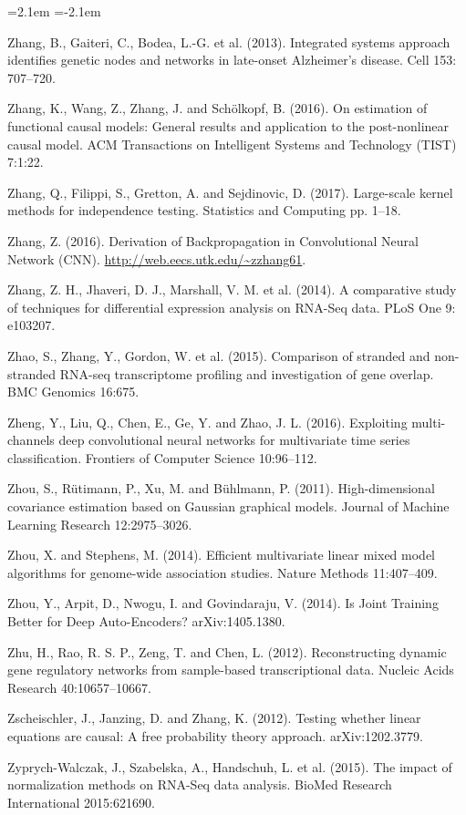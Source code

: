 \begin{list}{}{\leftmargin=2.1em  
  \itemindent=-2.1em \parsep=0pt \itemsep=2pt \topsep=0pt}
\item Zhang, B., Gaiteri, C., Bodea, L.-G. et al. (2013). Integrated systems approach identifies genetic nodes and networks in late-onset Alzheimer's disease. Cell 153: 707--720.
\item Zhang, K., Wang, Z., Zhang, J. and Schölkopf, B. (2016). On estimation of functional causal models: General results and application to the post-nonlinear causal model. ACM Transactions on Intelligent Systems and Technology (TIST) 7:1:22.
\item Zhang, Q., Filippi, S., Gretton, A. and Sejdinovic, D. (2017). Large-scale kernel methods for independence testing. Statistics and Computing pp. 1--18.
\item Zhang, Z. (2016). Derivation of Backpropagation in Convolutional Neural Network (CNN). \url{http://web.eecs.utk.edu/~zzhang61}.
\item Zhang, Z. H., Jhaveri, D. J., Marshall, V. M. et al. (2014). A comparative study of techniques for differential expression analysis on RNA-Seq data. PLoS One 9: e103207.
\item Zhao, S., Zhang, Y., Gordon, W. et al. (2015). Comparison of stranded and non-stranded RNA-seq transcriptome profiling and investigation of gene overlap. BMC Genomics 16:675.
\item Zheng, Y., Liu, Q., Chen, E., Ge, Y. and Zhao, J. L. (2016). Exploiting multi-channels deep convolutional neural networks for multivariate time series classification. Frontiers of Computer Science 10:96--112.
\item Zhou, S., Rütimann, P., Xu, M. and Bühlmann, P. (2011). High-dimensional covariance estimation based on Gaussian graphical models. Journal of Machine Learning Research 12:2975--3026.
\item Zhou, X. and Stephens, M. (2014). Efficient multivariate linear mixed model algorithms for genome-wide association studies. Nature Methods 11:407--409.
\item Zhou, Y., Arpit, D., Nwogu, I. and Govindaraju, V. (2014). Is Joint Training Better for Deep Auto-Encoders? arXiv:1405.1380.
\item Zhu, H., Rao, R. S. P., Zeng, T. and Chen, L. (2012). Reconstructing dynamic gene regulatory networks from sample-based transcriptional data. Nucleic Acids Research 40:10657--10667.
\item Zscheischler, J., Janzing, D. and Zhang, K. (2012). Testing whether linear equations are causal: A free probability theory approach. arXiv:1202.3779.
\item Zyprych-Walczak, J., Szabelska, A., Handschuh, L. et al. (2015). The impact of normalization methods on RNA-Seq data analysis. BioMed Research International 2015:621690.
\end{list}
\endgroup

